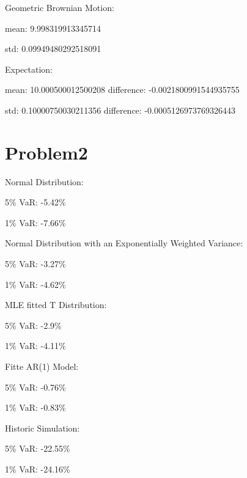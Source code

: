 \documentclass{article}
\begin{document}
Geometric Brownian Motion: \par
mean:  9.998319913345714\par
std:  0.09949480292518091\par
Expectation: \par
mean:  10.000500012500208       difference:  -0.0021800991544935755\par
std:  0.10000750030211356       difference:  -0.0005126973769326443\par

\section{Problem2}

Normal Distribution: \par
5\% VaR: -5.42\%\par
1\% VaR: -7.66\%\par

Normal Distribution with an Exponentially Weighted Variance: \par
5\% VaR: -3.27\%\par
1\% VaR: -4.62\%\par

MLE fitted T Distribution: \par
5\% VaR: -2.9\%\par
1\% VaR: -4.11\%\par

Fitte AR(1) Model: \par
5\% VaR: -0.76\%\par
1\% VaR: -0.83\%\par

Historic Simulation: \par
5\% VaR: -22.55\%\par
1\% VaR: -24.16\%\par
\end{document}
